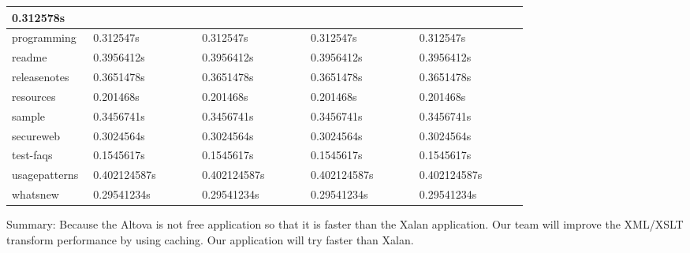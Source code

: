 \documentclass[letterpaper,10pt,titlepage]{article}
\begin{document}
\begin{longtable}{ | p{0.15\linewidth} | p{0.2\linewidth} | p{0.2\linewidth} | p{0.2\linewidth} | p{0.2\linewidth} |}
    0.312578s \\
    \hline
    programming &
    0.312547s &
    0.312547s &
    0.312547s &
    0.312547s \\
    \hline
    readme &
    0.3956412s &
    0.3956412s &
    0.3956412s &
    0.3956412s \\
    \hline
    releasenotes &
    0.3651478s &
    0.3651478s &
    0.3651478s &
    0.3651478s \\
    \hline
    resources &
    0.201468s &
    0.201468s &
    0.201468s &
    0.201468s \\
    \hline
    sample &
    0.3456741s &
    0.3456741s &
    0.3456741s &
    0.3456741s \\
    \hline
    secureweb &
    0.3024564s &
    0.3024564s &
    0.3024564s &
    0.3024564s \\
    \hline
    test-faqs &
    0.1545617s &
    0.1545617s &
    0.1545617s &
    0.1545617s \\
    \hline
    usagepatterns &
    0.402124587s &
    0.402124587s &
    0.402124587s &
    0.402124587s \\
    \hline
    whatsnew &
    0.29541234s &
    0.29541234s &
    0.29541234s &
    0.29541234s \\
    \hline
\end{longtable}
Summary:
Because the Altova is not free application so that it is faster than the Xalan application.
Our team will improve the XML/XSLT transform performance by using caching. 
Our application will try faster than Xalan. 


\newpage
\end{document}
